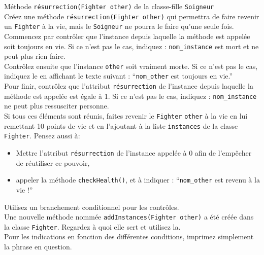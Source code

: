 \begin{Exercice}[15 minutes] Méthode \lstinline{résurrection(Fighter other)} de la classe-fille \lstinline{Soigneur} \\
Créez une méthode \lstinline{résurrection(Fighter other)} qui permettra de faire revenir un \lstinline{Fighter} à la vie, mais le \lstinline{Soigneur} ne pourra le faire qu'une seule fois. \\

Commencez par contrôler que l'instance depuis laquelle la méthode est appelée soit toujours en vie. Si ce n'est pas le cas, indiquez : \lstinline{nom_instance} est mort et ne peut plus rien faire.  \\ 

Contrôlez ensuite que l'instance \lstinline{other} soit vraiment morte. Si ce n'est pas le cas, indiquez le en affichant le texte suivant : ``\lstinline{nom_other} est toujours en vie.'' \\

Pour finir, contrôlez que l'attribut \lstinline{résurrection} de l'instance depuis laquelle la méthode est appelée est égale à 1. Si ce n'est pas le cas, indiquez : \lstinline{nom_instance} ne peut plus ressusciter personne.\\

Si tous ces éléments sont réunis, faites revenir le \lstinline{Fighter} \lstinline{other} à la vie en lui remettant 10 points de vie et en l'ajoutant à la liste \lstinline{instances} de la classe \lstinline{Fighter}. Pensez aussi à:

\begin{itemize}
	\item Mettre l'attribut \lstinline{résurrection} de l'instance appelée à 0 afin de l'empêcher de réutiliser ce pouvoir,
	\item appeler la méthode \lstinline{checkHealth()}, et à indiquer : ``\lstinline{nom_other} est revenu à la vie !''
\end{itemize}

\begin{conseil}
Utilisez un branchement conditionnel pour les contrôles. \\

Une nouvelle méthode nommée \lstinline{addInstances(Fighter other)} a été créée dans la classe \lstinline{Fighter}. Regardez à quoi elle sert et utilisez la. \\

Pour les indications en fonction des différentes conditions, imprimez simplement la phrase en question. \\
\end{conseil}

\begin{solution}
	
\end{solution}

\end{Exercice}

